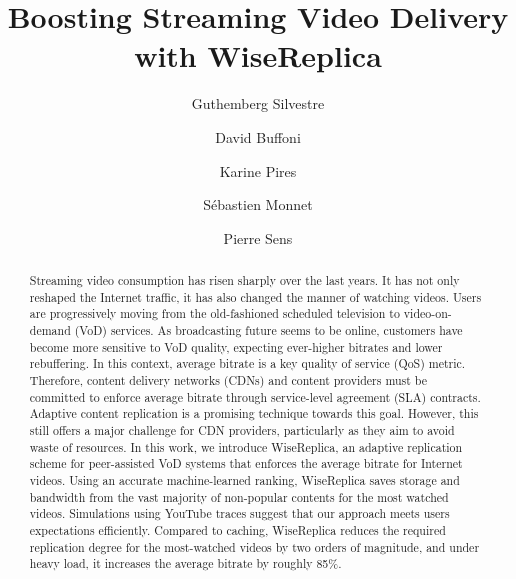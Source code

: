 \documentclass{llncs}
\begin{document}
\title{Boosting Streaming Video Delivery with WiseReplica}


\author{Guthemberg Silvestre \and David Buffoni \and  Karine Pires \and S\'{e}bastien Monnet \and Pierre Sens}


\maketitle

\begin{abstract}

Streaming video consumption has risen sharply over the last years. It
has not only reshaped the Internet traffic, it has also changed the
manner of watching videos. Users are progressively moving from the
old-fashioned scheduled television to video-on-demand (VoD)
services. As broadcasting future seems to be online, customers have
become more sensitive to VoD quality, expecting ever-higher bitrates
and lower rebuffering. In this context, average bitrate is a key
quality of service (QoS) metric. Therefore, content delivery networks
(CDNs) and content providers must be committed to enforce average
bitrate through service-level agreement (SLA) contracts. Adaptive
content replication is a promising technique towards this
goal. However, this still offers a major challenge for CDN providers,
particularly as they aim to avoid waste of resources. In this work, we
introduce WiseReplica, an adaptive replication scheme for
peer-assisted VoD systems that enforces the average bitrate for
Internet videos. Using an accurate machine-learned ranking,
WiseReplica saves storage and bandwidth from the vast majority of
non-popular contents for the most watched videos. Simulations using
YouTube traces suggest that our approach meets users expectations efficiently.  Compared to caching, WiseReplica reduces the required replication degree for the most-watched videos by two orders of magnitude, and under heavy load, it increases the average bitrate by roughly 85\%.

\end{abstract}
\end{document}
